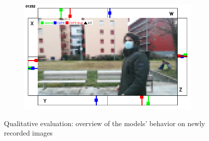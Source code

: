 \begin{figure}[H]
\begin{center}
\begin{subfigure}[h]{0.49\textwidth}
		\end{subfigure}
		\hfill
		\begin{subfigure}[h]{0.49\textwidth}
			\centering
			\includegraphics[width=0.98\textwidth]{"contents/images/qualitative-videos/perfect5-square02-1252"}
		\end{subfigure}
		\vfill
	\end{center}
	\vspace{-0.5cm}
	\caption[Qualitative evaluation: overview of the models' behavior on newly recorded images]{Qualitative evaluation: overview of the models' behavior on newly recorded images}
	\label{fig:ql-sim-intro}
\end{figure}

